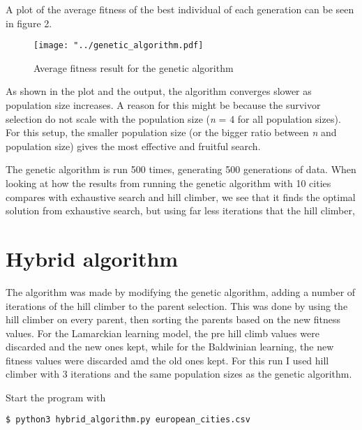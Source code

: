 \documentclass{article}
\begin{document}
\noindent
A plot of the average fitness of the best individual of each generation can be seen in figure 2.
\begin{figure}[H]
\begin{center}
\texttt{[image: "../genetic\_algorithm.pdf]}
\caption{Average fitness result for the genetic algorithm}
\end{center}
\end{figure}
\noindent
As shown in the plot and the output, the algorithm converges slower as population size increases. A reason for this might be because the survivor selection do not scale with the population size (\textit{n} = 4 for all population sizes). For this setup, the smaller population size (or the bigger ratio between \textit{n} and population size) gives the most effective and fruitful search.

The genetic algorithm is run 500 times, generating 500 generations of data. When looking at how the results from running the genetic algorithm with 10 cities compares with exhaustive search and hill climber, we see that it finds the optimal solution from exhaustive search, but using far less iterations that the hill climber,
\section{Hybrid algorithm}
The algorithm was made by modifying the genetic algorithm, adding a number of iterations of the hill climber to the parent selection. This was done by using the hill climber on every parent, then sorting the parents based on the new fitness values. For the Lamarckian learning model, the pre hill climb values were discarded and the new ones kept, while for the Baldwinian learning, the new fitness values were discarded amd the old ones kept. For this run I used hill climber with 3 iterations and the same population sizes as the genetic algorithm.

Start the program with
\begin{lstlisting}[language=bash]
	$ python3 hybrid_algorithm.py european_cities.csv 
\end{lstlisting}
\end{document}
